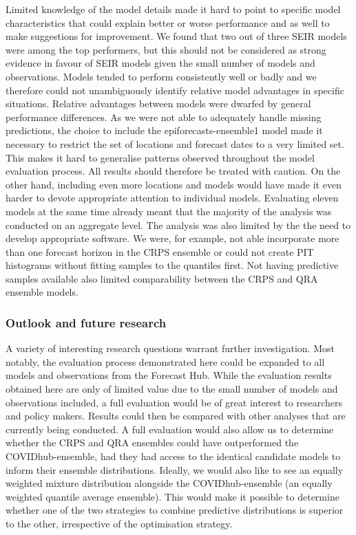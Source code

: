 \documentclass[
]{book}
\begin{document}
Limited knowledge of the model details made it hard to point to specific model characteristics that could explain better or worse performance and as well to make suggestions for improvement. We found that two out of three SEIR models were among the top performers, but this should not be considered as strong evidence in favour of SEIR models given the small number of models and observations. Models tended to perform consistently well or badly and we therefore could not unambiguously identify relative model advantages in specific situations. Relative advantages between models were dwarfed by general performance differences.
As we were not able to adequately handle missing predictions, the choice to include the epiforecasts-ensemble1 model made it necessary to restrict the set of locations and forecast dates to a very limited set. This makes it hard to generalise patterns observed throughout the model evaluation process. All results should therefore be treated with caution. On the other hand, including even more locations and models would have made it even harder to devote appropriate attention to individual models. Evaluating eleven models at the same time already meant that the majority of the analysis was conducted on an aggregate level.
The analysis was also limited by the the need to develop appropriate software. We were, for example, not able incorporate more than one forecast horizon in the CRPS ensemble or could not create PIT histograms without fitting samples to the quantiles first. Not having predictive samples available also limited comparability between the CRPS and QRA ensemble models.

\hypertarget{outlook-and-future-research}{%
\subsubsection*{Outlook and future research}\label{outlook-and-future-research}}

A variety of interesting research questions warrant further investigation. Most notably, the evaluation process demonstrated here could be expanded to all models and observations from the Forecast Hub. While the evaluation results obtained here are only of limited value due to the small number of models and observations included, a full evaluation would be of great interest to researchers and policy makers. Results could then be compared with other analyses that are currently being conducted. A full evaluation would also allow us to determine whether the CRPS and QRA ensembles could have outperformed the COVIDhub-ensemble, had they had access to the identical candidate models to inform their ensemble distributions. Ideally, we would also like to see an equally weighted mixture distribution alongside the COVIDhub-ensemble (an equally weighted quantile average ensemble). This would make it possible to determine whether one of the two strategies to combine predictive distributions is superior to the other, irrespective of the optimisation strategy.
\end{document}

